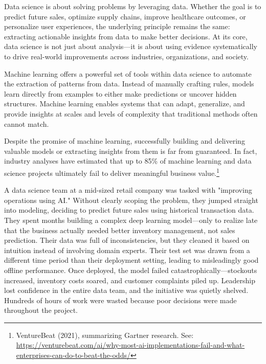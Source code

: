 \documentclass[12pt,openany, draft]{book}
\begin{document}
Data science is about solving problems by leveraging data. Whether the goal is to predict future sales, optimize supply chains, improve healthcare outcomes, or personalize user experiences, the underlying principle remains the same: extracting actionable insights from data to make better decisions. At its core, data science is not just about analysis—it is about using evidence systematically to drive real-world improvements across industries, organizations, and society. \newline

Machine learning offers a powerful set of tools within data science to automate the extraction of patterns from data. Instead of manually crafting rules, models learn directly from examples to either make predictions or uncover hidden structures. Machine learning enables systems that can adapt, generalize, and provide insights at scales and levels of complexity that traditional methods often cannot match. \newline

Despite the promise of machine learning, successfully building and delivering valuable models or extracting insights from them is far from guaranteed. In fact, industry analyses have estimated that up to 85\% of machine learning and data science projects ultimately fail to deliver meaningful business value.\footnote{VentureBeat (2021), summarizing Gartner research. See: \url{https://venturebeat.com/ai/why-most-ai-implementations-fail-and-what-enterprises-can-do-to-beat-the-odds/}}

\begin{examplebox}
A data science team at a mid-sized retail company was tasked with "improving operations using AI." Without clearly scoping the problem, they jumped straight into modeling, deciding to predict future sales using historical transaction data. They spent months building a complex deep learning model—only to realize late that the business actually needed better inventory management, not sales prediction. Their data was full of inconsistencies, but they cleaned it based on intuition instead of involving domain experts. Their test set was drawn from a different time period than their deployment setting, leading to misleadingly good offline performance. Once deployed, the model failed catastrophically—stockouts increased, inventory costs soared, and customer complaints piled up. Leadership lost confidence in the entire data team, and the initiative was quietly shelved. Hundreds of hours of work were wasted because poor decisions were made throughout the project.
\end{examplebox}
\end{document}
